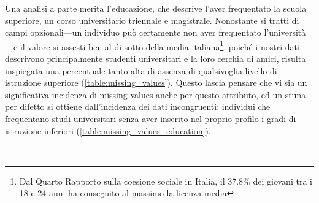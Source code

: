 \begin{table}[h]
\end{table}
Una analisi a parte merita l'educazione, che descrive l'aver frequentato la scuola superiore, un corso universitario triennale e magistrale. Nonostante si tratti di campi opzionali---un individuo può certamente non aver frequentato l'università---e il valore si assesti ben al di sotto della media italiana\footnote{Dal Quarto Rapporto sulla coesione sociale in Italia, il 37.8\% dei giovani tra i 18 e 24 anni ha conseguito al massimo la licenza media}, poiché i nostri dati descrivono principalmente studenti universitari e la loro cerchia di  amici, risulta inspiegata una percentuale tanto alta di assenza di qualsivoglia livello di istruzione superiore (\autoref{table:missing_values}). Questo lascia pensare che vi sia un significativa incidenza di missing values anche per questo attributo, ed un stima per difetto si ottiene dall'incidenza dei dati incongruenti: individui che frequentano studi universitari senza aver inserito nel proprio profilo i gradi di istruzione inferiori (\autoref{table:missing_values_education}).
\begin{table}[h]
\end{table}\\
